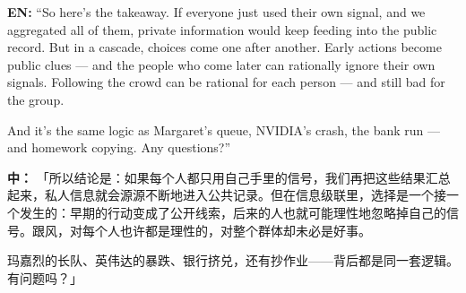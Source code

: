 \documentclass[11pt]{article}
\begin{document}
\textbf{EN:} “So here's the takeaway. If everyone just used their own signal, and we aggregated all of them, private information would keep feeding into the public record. But in a cascade, choices come one after another. Early actions become public clues — and the people who come later can rationally ignore their own signals. Following the crowd can be rational for each person — and still bad for the group.\par

And it's the same logic as Margaret's queue, NVIDIA's crash, the bank run — and homework copying. Any questions?”\par

\textbf{中：} 「所以结论是：如果每个人都只用自己手里的信号，我们再把这些结果汇总起来，私人信息就会源源不断地进入公共记录。但在信息级联里，选择是一个接一个发生的：早期的行动变成了公开线索，后来的人也就可能理性地忽略掉自己的信号。跟风，对每个人也许都是理性的，对整个群体却未必是好事。\par

玛嘉烈的长队、英伟达的暴跌、银行挤兑，还有抄作业——背后都是同一套逻辑。有问题吗？」\par
\end{document}
